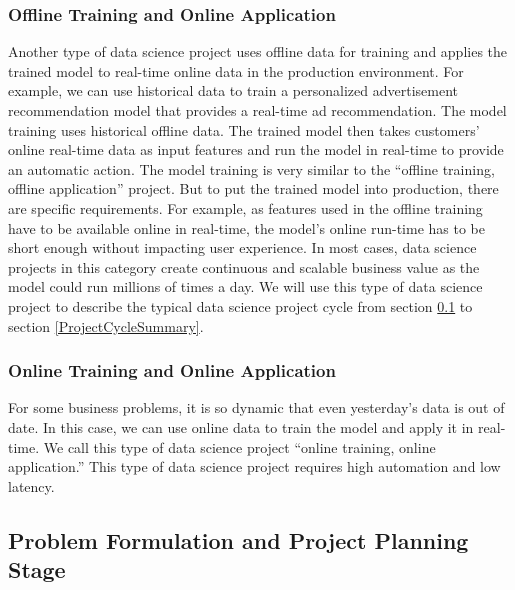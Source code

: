 \documentclass[
  12pt,
]{krantz}
\begin{document}
\hypertarget{offline-training-and-online-application}{%
\subsubsection{Offline Training and Online Application}\label{offline-training-and-online-application}}

Another type of data science project uses offline data for training and applies the trained model to real-time online data in the production environment. For example, we can use historical data to train a personalized advertisement recommendation model that provides a real-time ad recommendation. The model training uses historical offline data. The trained model then takes customers' online real-time data as input features and run the model in real-time to provide an automatic action. The model training is very similar to the ``offline training, offline application'' project. But to put the trained model into production, there are specific requirements. For example, as features used in the offline training have to be available online in real-time, the model's online run-time has to be short enough without impacting user experience. In most cases, data science projects in this category create continuous and scalable business value as the model could run millions of times a day. We will use this type of data science project to describe the typical data science project cycle from section \ref{ProblemFormulationandProjectPlanningStage} to section \ref{ProjectCycleSummary}.

\hypertarget{online-training-and-online-application}{%
\subsubsection{Online Training and Online Application}\label{online-training-and-online-application}}

For some business problems, it is so dynamic that even yesterday's data is out of date. In this case, we can use online data to train the model and apply it in real-time. We call this type of data science project ``online training, online application.'' This type of data science project requires high automation and low latency.

\hypertarget{ProblemFormulationandProjectPlanningStage}{%
\subsection{Problem Formulation and Project Planning Stage}\label{ProblemFormulationandProjectPlanningStage}}
\end{document}
